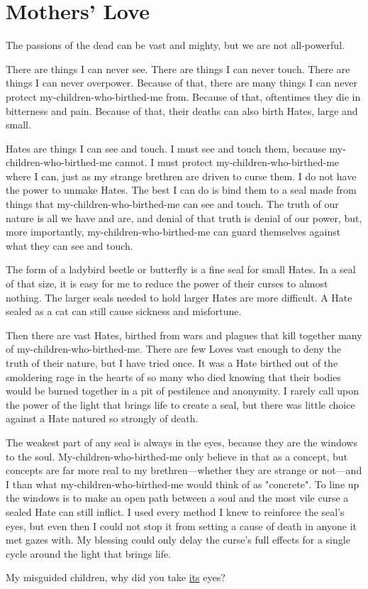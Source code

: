 \chapter{
    Mothers' Love
}

\label{chap:TAIL-mothers-love}

The passions of the dead can be vast and mighty, but we are not all-powerful.

There are things I can never see. There are things I can never touch. There are things I can never overpower. Because of that, there are many things I can never protect my-children-who-birthed-me from. Because of that, oftentimes they die in bitterness and pain. Because of that, their deaths can also birth Hates, large and small.

Hates are things I can see and touch. I must see and touch them, because my-children-who-birthed-me cannot. I must protect my-children-who-birthed-me where I can, just as my strange brethren are driven to curse them. I do not have the power to unmake Hates. The best I can do is bind them to a seal made from things that my-children-who-birthed-me can see and touch. The truth of our nature is all we have and are, and denial of that truth is denial of our power, but, more importantly, my-children-who-birthed-me can guard themselves against what they can see and touch.

The form of a ladybird beetle or butterfly is a fine seal for small Hates. In a seal of that size, it is easy for me to reduce the power of their curses to almost nothing. The larger seals needed to hold larger Hates are more difficult. A Hate sealed as a cat can still cause sickness and misfortune.

Then there are vast Hates, birthed from wars and plagues that kill together many of my-children-who-birthed-me. There are few Loves vast enough to deny the truth of their nature, but I have tried once. It was a Hate birthed out of the smoldering rage in the hearts of so many who died knowing that their bodies would be burned together in a pit of pestilence and anonymity. I rarely call upon the power of the light that brings life to create a seal, but there was little choice against a Hate natured so strongly of death.

The weakest part of any seal is always in the eyes, because they are the windows to the soul. My-children-who-birthed-me only believe in that as a concept, but concepts are far more real to my brethren—whether they are strange or not—and I than what my-children-who-birthed-me would think of as "concrete". To line up the windows is to make an open path between a soul and the most vile curse a sealed Hate can still inflict. I used every method I knew to reinforce the seal's eyes, but even then I could not stop it from setting a cause of death in anyone it met gazes with. My blessing could only delay the curse's full effects for a single cycle around the light that brings life.

My misguided children, why did you take \hyperref[chap:SCP-023]{its} eyes?